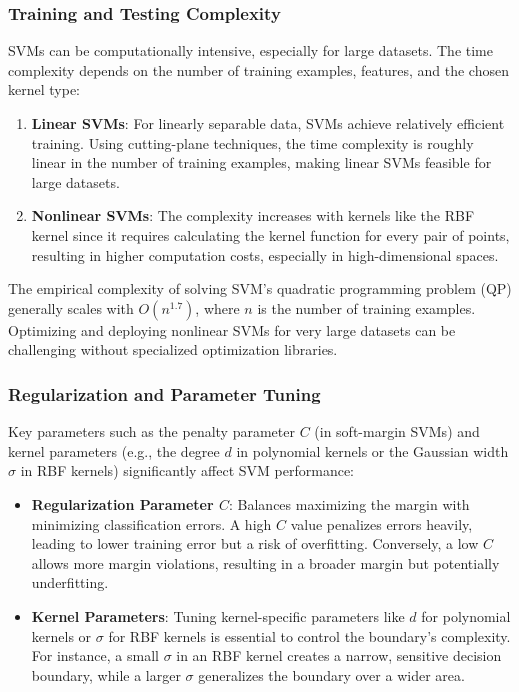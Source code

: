 \documentclass{article}
\begin{document}
\subsubsection*{Training and Testing Complexity}
SVMs can be computationally intensive, especially for large datasets. The time complexity depends on the number of training examples, features, and the chosen kernel type:
\begin{enumerate}
    \item \textbf{Linear SVMs}: For linearly separable data, SVMs achieve relatively efficient training. Using cutting-plane techniques, the time complexity is roughly linear in the number of training examples, making linear SVMs feasible for large datasets.
    \item \textbf{Nonlinear SVMs}: The complexity increases with kernels like the RBF kernel since it requires calculating the kernel function for every pair of points, resulting in higher computation costs, especially in high-dimensional spaces.
\end{enumerate}

The empirical complexity of solving SVM’s quadratic programming problem (QP) generally scales with \( O(n^{1.7}) \), where \( n \) is the number of training examples. Optimizing and deploying nonlinear SVMs for very large datasets can be challenging without specialized optimization libraries.

\subsubsection*{Regularization and Parameter Tuning}
Key parameters such as the penalty parameter \( C \) (in soft-margin SVMs) and kernel parameters (e.g., the degree \( d \) in polynomial kernels or the Gaussian width \( \sigma \) in RBF kernels) significantly affect SVM performance:
\begin{itemize}
    \item \textbf{Regularization Parameter \( C \)}: Balances maximizing the margin with minimizing classification errors. A high \( C \) value penalizes errors heavily, leading to lower training error but a risk of overfitting. Conversely, a low \( C \) allows more margin violations, resulting in a broader margin but potentially underfitting.
    \item \textbf{Kernel Parameters}: Tuning kernel-specific parameters like \( d \) for polynomial kernels or \( \sigma \) for RBF kernels is essential to control the boundary’s complexity. For instance, a small \( \sigma \) in an RBF kernel creates a narrow, sensitive decision boundary, while a larger \( \sigma \) generalizes the boundary over a wider area.
\end{itemize}
\end{document}
